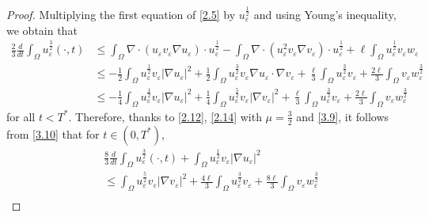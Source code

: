 \documentclass[10pt,a4paper]{amsart}
\begin{document}
\begin{proof}
 Multiplying the first equation of \eqref{2.5} by $u_\varepsilon^{\frac{1}{2}}$ and using Young's inequality, we obtain that
\begin{equation}\label{3.10}
    \begin{split}
        \frac{2}{3}\frac{d}{dt}\int_\Omega u_\varepsilon^{\frac{3}{2}}(\cdot,t)
        &\leq\int_\Omega\nabla\cdot(u_\varepsilon v_\varepsilon\nabla u_\varepsilon)\cdot u_\varepsilon^{\frac{1}{2}}-\int_\Omega\nabla\cdot(u_\varepsilon^2v_\varepsilon\nabla v_\varepsilon)\cdot u_\varepsilon^{\frac{1}{2}}+\ell\int_\Omega u_\varepsilon ^{\frac{1}{2}}v_\varepsilon w_\varepsilon\\
        &\leq-\frac12\int_\Omega u_\varepsilon^{\frac{1}{2}}v_\varepsilon|\nabla u_\varepsilon|^2+\frac12\int_\Omega u_\varepsilon^{\frac{3}{2}}v_\varepsilon\nabla u_\varepsilon\cdot\nabla v_\varepsilon+\frac{\ell}{3}\int_\Omega u_\varepsilon ^{\frac{3}{2}}v_\varepsilon+\frac{2\ell}{3}\int_\Omega v_\varepsilon w_\varepsilon^{\frac3 2}\\
        &\leq-\frac{1}{4}\int_\Omega u_\varepsilon^{\frac{1}{2}}v_\varepsilon|\nabla u_\varepsilon|^2+\frac{1}{4}\int_\Omega u_\varepsilon^{\frac{5}{2}}v_\varepsilon|\nabla v_\varepsilon|^2+\frac{\ell}{3}\int_\Omega u_\varepsilon ^{\frac{3}{2}}v_\varepsilon+\frac{2\ell}{3}\int_\Omega v_\varepsilon w_\varepsilon^{\frac3 2}
        \end{split}
\end{equation}
for all $ t<T^*$. Therefore, thanks to \eqref{2.12}, \eqref{2.14} with $\mu=\frac3 2$ and \eqref{3.9},  it follows from \eqref{3.10} that for $ t\in (0,T^*)$,
\begin{align}\label{3.11}
        ~&\frac{8}{3}\frac{d}{dt}\int_\Omega u_\varepsilon^{\frac{3}{2}}(\cdot,t)+\int_\Omega u_\varepsilon^{\frac{1}{2}}v_\varepsilon|\nabla u_\varepsilon|^2\nonumber\\
        &\leq\int_\Omega u_\varepsilon^{\frac{5}{2}}v_\varepsilon|\nabla v_\varepsilon|^2+\frac{4\ell}{3}\int_\Omega u_\varepsilon ^{\frac{3}{2}}v_\varepsilon+\frac{8\ell}{3}\int_\Omega v_\varepsilon w_\varepsilon^{\frac3 2}\nonumber\\

\end{align}
\end{proof}
\end{document}
